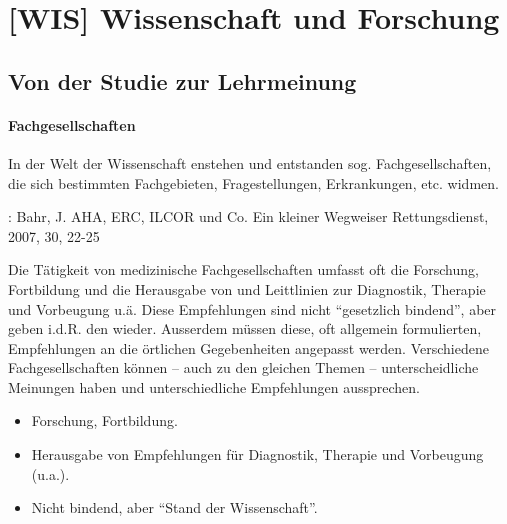 \chapter{[WIS] Wissenschaft und Forschung}
\label{chp:WIS}

\section{Von der Studie zur Lehrmeinung}

\subsubsection{Fachgesellschaften}

In der Welt der Wissenschaft enstehen und entstanden sog. Fachgesellschaften,
die sich bestimmten Fachgebieten, Fragestellungen, Erkrankungen, etc. widmen.

\cite{Bahr200701}: Bahr, J. AHA, ERC, ILCOR und Co. Ein kleiner Wegweiser
Rettungsdienst, 2007, 30, 22-25

{
Die Tätigkeit von medizinische Fachgesellschaften umfasst oft die Forschung,
Fortbildung und die Herausgabe von
 und Leittlinien zur Diagnostik, Therapie und Vorbeugung
u.ä. Diese Empfehlungen sind nicht "`gesetzlich bindend"', aber geben i.d.R.
den  wieder. Ausserdem müssen diese, oft allgemein
formulierten, Empfehlungen an die örtlichen Gegebenheiten angepasst
werden. Verschiedene Fachgesellschaften können -- auch zu den gleichen Themen --
unterscheidliche Meinungen haben und unterschiedliche Empfehlungen aussprechen.
}{
\begin{itemize}
   \item Forschung, Fortbildung. 
   \item Herausgabe von Empfehlungen für Diagnostik, Therapie und
   Vorbeugung (u.a.).
   \item Nicht bindend, aber "`Stand der Wissenschaft"'.
\end{itemize}
}{}{}{}



